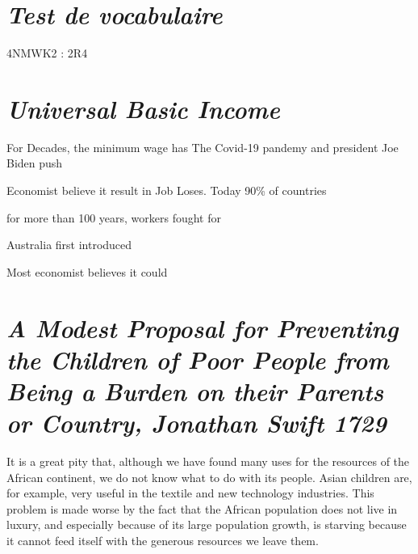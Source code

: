 \documentclass[a4paper,english,bookmarks]{article}
\begin{document}
\newboxans

\hfill\newline

\section*{\centering\EBGaramond\Large\itshape Test de vocabulaire}

4NMWK2 : 2R4

\section*{\centering\EBGaramond\Large\itshape Universal Basic Income}

For Decades, the minimum wage has 
The Covid-19 pandemy and president Joe Biden push 

Economist believe it result in Job Loses. Today 90\% of countries 

for more than 100 years, workers fought for 

Australia first introduced

Most economist believes it could


\section*{\centering\EBGaramond\Large\itshape A Modest Proposal for Preventing the Children of Poor People from Being a Burden on their Parents or Country, Jonathan Swift 1729}

It is a great pity that, although we have found many uses for the resources of the African continent, we do not know what to do with its people. Asian children are, for example, very useful in the textile and new technology industries. This problem is made worse by the fact that the African population does not live in luxury, and especially because of its large population growth, is starving because it cannot feed itself with the generous resources we leave them.
\end{document}
